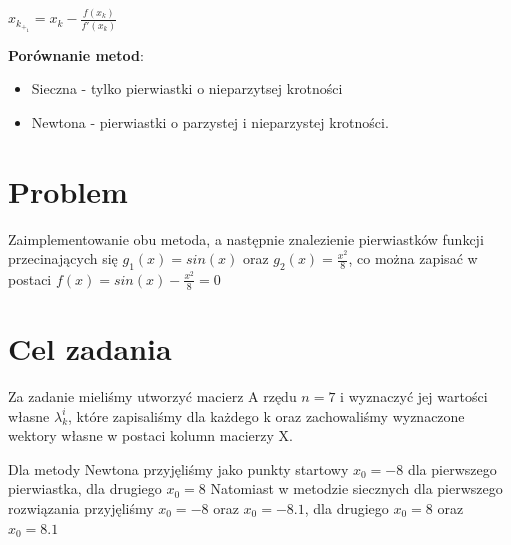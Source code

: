 \documentclass{article}
\begin{document}
\begin{center}
$x_k_+_1 = x_k-\frac{f(x_k)}{f'(x_k)}$
\end{center}

\textbf{Porównanie metod}:
\begin{itemize}
    \item Sieczna - tylko pierwiastki o nieparzytsej krotności
    \item Newtona - pierwiastki o parzystej i nieparzystej krotności.
\end{itemize}

\section{Problem}
Zaimplementowanie obu metoda, a następnie znalezienie
pierwiastków funkcji przecinających się $g_1(x)=sin(x)$ oraz $g_2(x)=\frac{x^2}{8}$, co można zapisać w postaci $f(x)=sin(x)-\frac{x^2}{8}=0$




\section{Cel zadania}
Za zadanie mieliśmy utworzyć macierz A rzędu $n=7$ i wyznaczyć jej wartości własne $\lambda_k^i$, które zapisaliśmy dla każdego k   oraz zachowaliśmy wyznaczone wektory własne w postaci kolumn macierzy X.

Dla metody Newtona przyjęliśmy jako punkty startowy $x_0=-8$ dla pierwszego pierwiastka, dla drugiego $x_0=8$ Natomiast w metodzie siecznych dla pierwszego rozwiązania przyjęliśmy $x_0=-8$ oraz $x_0=-8.1$, dla
drugiego $x_0=8$ oraz $x_0=8.1$
\end{document}
